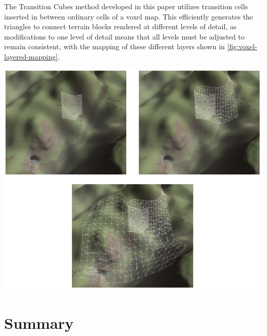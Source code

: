 \documentclass[10pt]{report}
\begin{document}
		The Transition Cubes method developed in this paper utilizes transition cells inserted in between ordinary cells of a voxel map. This efficiently generates the triangles to connect terrain blocks rendered at different levels of detail, as modifications to one level of detail means that all levels must be adjusted to remain consistent, with the mapping of these different layers shown in \autoref{fig:voxel-layered-mapping}.
		
		\begin{minipage}{\textwidth}
			\centering
			\includegraphics[scale=.75]{voxel-detail}
			\label{fig:voxel-layered-mapping}
		\end{minipage}
			
	\vspace{10pt}
	\let\clearpage\relax
	\chapter{Summary}
		
\end{document}

